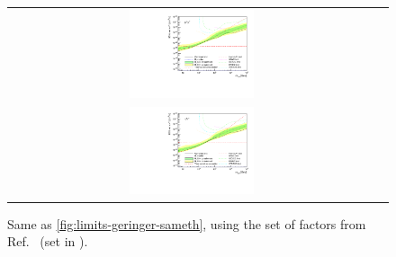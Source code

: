 \begin{figure}[h]
{\begin{tabular}{cc}
        \includegraphics[width=0.35\textwidth]{figures/glory_duck/limits/Glory_Duck_Annihilation_mumu_Bonnivard_Combination_bands.pdf} \\
        \includegraphics[width=0.35\textwidth]{figures/glory_duck/limits/Glory_Duck_Annihilation_tautau_Bonnivard_Combination_bands.pdf} &
        \end{tabular}
        }
        \caption{Same as \cref{fig:limits-geringer-sameth}, using the set of \J factors from Ref.~\cite{Bonnivard:2014kza, Bonnivard:2015xpq} (\B set in ).}
    \label{fig:limits-bonnivard}
    \end{figure}

